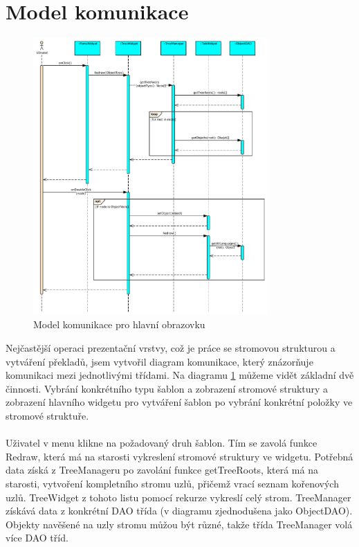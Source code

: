 \documentclass[thesis=B,czech]{resources/FITthesis}[2012/06/26]
\begin{document}
	\section{Model komunikace}
	\begin{figure}\centering
	\includegraphics[width=0.8\textwidth]{images/comunication_main}
	\caption[Model komunikace pro hlavní obrazovku]{Model komunikace pro hlavní obrazovku}\label{fig:comunication_main}
	\end{figure}
Nejčastější operaci prezentační vrstvy, což je práce se stromovou strukturou a vytváření překladů, jsem vytvořil diagram komunikace, který znázorňuje komunikaci mezi jednotlivými třídami. Na diagramu \ref{fig:comunication_main} můžeme vidět základní dvě činnosti. Vybrání konkrétního typu šablon a zobrazení stromové struktury a zobrazení hlavního widgetu pro vytváření šablon po vybrání konkrétní položky ve stromové struktuře.\\
\\
Uživatel v menu klikne na požadovaný druh šablon. Tím se zavolá funkce Redraw, která má na starosti vykreslení stromové struktury ve widgetu. Potřebná data získá z TreeManageru po zavolání funkce getTreeRoots, která má na starosti, vytvoření kompletního stromu uzlů, přičemž vrací seznam kořenových uzlů. TreeWidget z tohoto listu pomocí rekurze vykreslí celý strom. TreeManager získává data z konkrétní DAO třída (v diagramu zjednodušena jako ObjectDAO). Objekty navěšené na uzly stromu můžou být různé, takže třída TreeManager volá více DAO tříd.\\
\end{document}
